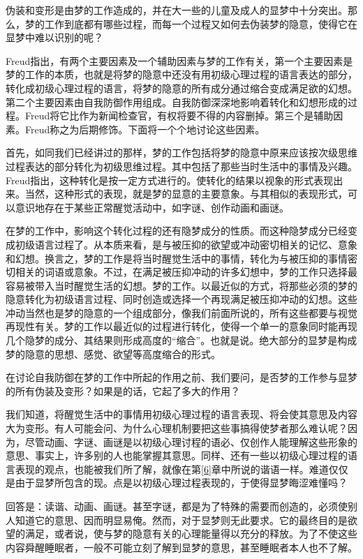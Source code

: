 \documentclass[UTF8,10pt,a4paper,openany]{book}
\begin{document}
伪装和变形是由梦的工作造成的，并在大一些的儿童及成人的显梦中十分突出。那么，梦的工作到底都有哪些过程，而每一个过程又如何去伪装梦的隐意，使得它在显梦中难以识别的呢？

Freud指出，有两个主要因素及一个辅助因素与梦的工作有关，第一个主要因素是梦的工作的本质，也就是将梦的隐意中还没有用初级心理过程的语言表达的部分，转化成初级心理过程的语言，将梦的隐意的所有成分通过缩合变成满足欲的幻想。第二个主要因素由自我防御作用组成。自我防御深深地影响着转化和幻想形成的过程。Freud将它比作为新闻检查官，有权将要不得的内容删掉。第三个是辅助因素。Freud称之为后期修饰。下面将一个个地讨论这些因素。

首先，如同我们已经讲过的那样，梦的工作包括将梦的隐意中原来应该按次级思维过程表达的部分转化为初级思维过程。其中包括了那些当时生活中的事情及兴趣。Freud指出，这种转化是按一定方式进行的。使转化的结果以视象的形式表现出来。当然，这种形式的表现，就是梦的显意的主要意象。与其相似的表现形式，可以意识地存在于某些正常醒觉活动中，如字谜、创作动画和画谜。

在梦的工作中，影响这个转化过程的还有隐梦成分的性质。而这种隐梦成分已经变成初级语言过程了。从本质来看，是与被压抑的欲望或冲动密切相关的记忆、意象和幻想。换言之，梦的工作是将当时醒觉生活中的事情，转化为与被压抑的事情密切相关的词语或意象。不过，在满足被压抑冲动的许多幻想中，梦的工作只选择最容易被带入当时醒觉生活的幻想。梦的工作。以最近似的方式，将那些必须的梦的隐意转化为初级语言过程、同时创造或选择一个再现满足被压抑冲动的幻想。这些冲动当然也是梦的隐意的一个组成部分，像我们前面所说的，所有这些都要与视觉再现性有关。梦的工作以最近似的过程进行转化，使得一个单一的意象同时能再现几个隐梦的成分、其结果则形成高度的“缩合”。也就是说。绝大部分的显梦是构成梦的隐意的思想、感觉、欲望等高度缩合的形式。

在讨论自我防御在梦的工作中所起的作用之前、我们要问，是否梦的工作参与显梦的所有伪装及变形？如果是的话，它起了多大的作用？

我们知道，将醒觉生活中的事情用初级心理过程的语言表现、将会使其意思及内容大为变形。有人可能会问、为什么心理机制要把这些事搞得使梦者那么难认呢？因为，尽管动画、字谜、画谜是以初级心理讨程的语必、仅创作人能理解这些形象的意思、事实上，许多别的人也能掌握其意思。同样、还有一些以初级心理过程的语言表现的观点，也能被我们所了解，就像在第\ref{6}章中所说的谐语一样。难道仅仅是由于显梦所包含的现。点是以初级心理过程表现的，于使得显梦晦涩难懂吗？

回答是：读谐、动画、画谜。甚至字谜，都是为了特殊的需要而创造的，必须使别人知道它的意思、因而明显易俺。然而，对于显梦则无此要求。它的最终目的是欲望的满足，或者说，使与梦的隐意有关的心理能量得以充分的释放。为了不使这些内容舜醒睡眠者，一般不可能立刻了解到显梦的意思，甚至睡眠者本人也不了解。
\end{document}
